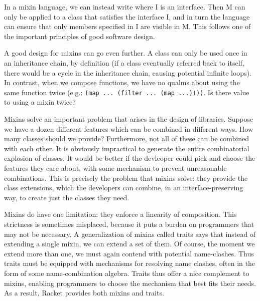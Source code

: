 In a mixin language, we can instead write
where I is an interface. Then M can only be applied to a class that satisfies
the interface I, and in turn the language can ensure that only members specified
in I are visible in M. This follows one of the important principles of good
software design.

A good design for mixins can go even further. A class can only be used once in
an inheritance chain, by definition (if a class eventually referred back to
itself, there would be a cycle in the inheritance chain, causing potential
infinite loops). In contrast, when we compose functions, we have no qualms about
using the same function twice (e.g.: \verb|(map ... (filter ... (map ...))))|.
Is there value to using a mixin twice?

Mixins solve an important problem that arises in the design of libraries.
Suppose we have a dozen different features which can be combined in different
ways. How many classes should we provide? Furthermore, not all of these can be
combined with each other. It is obviously impractical to generate the entire
combinatorial explosion of classes. It would be better if the devleoper could
pick and choose the features they care about, with some mechanism to prevent
unreasonable combinations. This is precisely the problem that mixins solve: they
provide the class extensions, which the developers can combine, in an
interface-preserving way, to create just the classes they need.


Mixins do have one limitation: they enforce a linearity of composition. This
strictness is sometimes misplaced, because it puts a burden on programmers that
may not be necessary. A generalization of mixins called traits says that instead
of extending a single mixin, we can extend a set of them. Of course, the moment
we extend more than one, we must again contend with potential name-clashes. Thus
traits must be equipped with mechanisms for resolving name clashes, often in the
form of some name-combination algebra. Traits thus offer a nice complement to
mixins, enabling programmers to choose the mechanism that best fits their needs.
As a result, Racket provides both mixins and traits.
